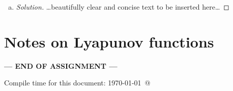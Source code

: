 \documentclass[12pt]{article}
\begin{document}
\begin{enumerate}[(a)]
{\begin{proof}[Solution]
Next we need to show that any trajectories with initial conditions in $\Delta \setminus \mathcal{O}$, in green in the diagram, will eventually land in $\mathcal{O}$ at which point we use the asymptotic stability of $\mathcal{C}$ as we showed above. 
For any point, $P \in \Delta \setminus \mathcal{O}, P=\{(S,I)|S \geq \frac{1}{\mathcal{R}_0}, I > 0, S+I \leq 1\}$. We can see from ~\eqref{E:SIR} that $\frac{dS}{dt} < 0$ for all $P$. This means that $S$ will decrease and continue to decrease until $P \in \mathcal{O}$, and by the asymptotic stability of $\mathcal{C}$ it will proceed to that set.
\break
This makes biological sense as any endemic will end eventually, at which point there will be no infectious individuals, so $I=0$. 

\end{proof}
}
\item \basicSIRanalQd

{\color{blue}
\begin{proof}[Solution]
{\color{magenta}\dots beautifully clear and concise text to be inserted here\dots}
\end{proof}
}

\end{enumerate}

\newpage
\section*{Notes on Lyapunov functions}\hypertarget{NotesLyapFuns}{}

\NotesOnLyapunovFunctions




\bigskip

\centerline{\bf--- END OF ASSIGNMENT ---}

\bigskip
Compile time for this document:
\today\ @ \thistime
\end{document}
